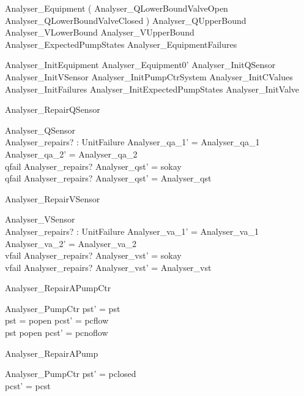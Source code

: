 \documentclass{article}
\begin{document}
\begin{zed}
	Analyser\_Equipment  ( Analyser\_QLowerBoundValveOpen \lor Analyser\_QLowerBoundValveClosed ) \land Analyser\_QUpperBound \land Analyser\_VLowerBound \land Analyser\_VUpperBound \land Analyser\_ExpectedPumpStates \land Analyser\_EquipmentFailures
\end{zed}

\begin{zed}
	Analyser\_InitEquipment  Analyser\_Equipment0' \land Analyser\_InitQSensor \land Analyser\_InitVSensor \land Analyser\_InitPumpCtrSystem \land Analyser\_InitCValues \land Analyser\_InitFailures \land Analyser\_InitExpectedPumpStates \land Analyser\_InitValve
\end{zed}

\begin{schema}{Analyser\_RepairQSensor}

 \Delta Analyser\_QSensor \\
 Analyser\_repairs? : \power UnitFailure 
\where
 Analyser\_qa\_1' = Analyser\_qa\_1 \\
 Analyser\_qa\_2' = Analyser\_qa\_2 \\
 qfail \in Analyser\_repairs? \implies Analyser\_qst' = sokay \\
 qfail \notin Analyser\_repairs? \implies Analyser\_qst' = Analyser\_qst
\end{schema}

\begin{schema}{Analyser\_RepairVSensor}

 \Delta Analyser\_VSensor \\
 Analyser\_repairs? : \power UnitFailure 
\where
 Analyser\_va\_1' = Analyser\_va\_1 \\
 Analyser\_va\_2' = Analyser\_va\_2 \\
 vfail \in Analyser\_repairs? \implies Analyser\_vst' = sokay \\
 vfail \notin Analyser\_repairs? \implies Analyser\_vst' = Analyser\_vst
\end{schema}

\begin{schema}{Analyser\_RepairAPumpCtr}

 \Delta Analyser\_PumpCtr 
\where
 pst' = pst \\
 pst = popen \implies pcst' = pcflow \\
 pst \neq popen \implies pcst' = pcnoflow
\end{schema}

\begin{schema}{Analyser\_RepairAPump}

 \Delta Analyser\_PumpCtr 
\where
 pst' = pclosed \\
 pcst' = pcst
\end{schema}
\end{document}
